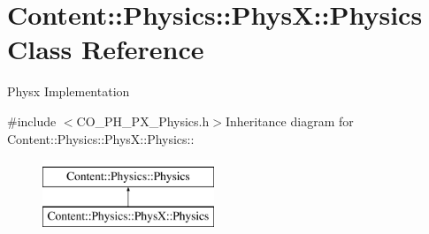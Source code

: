 \hypertarget{classContent_1_1Physics_1_1PhysX_1_1Physics}{
\section{Content::Physics::PhysX::Physics Class Reference}
\label{classContent_1_1Physics_1_1PhysX_1_1Physics}
}


Physx Implementation  


{\ttfamily \#include $<$CO\_\-PH\_\-PX\_\-Physics.h$>$}Inheritance diagram for Content::Physics::PhysX::Physics::\begin{figure}[H]
\begin{center}
\leavevmode
\includegraphics[height=2cm]{classContent_1_1Physics_1_1PhysX_1_1Physics}
\end{center}
\end{figure}
